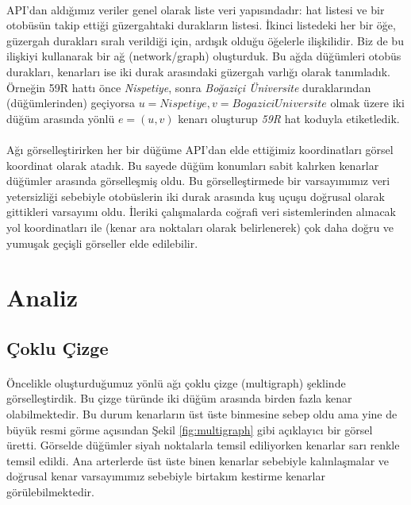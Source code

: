 \documentclass[10pt,a4paper,twocolumn]{article}
\begin{document}
\paragraph{} API'dan aldığımız veriler genel olarak liste veri yapısındadır: hat listesi ve bir otobüsün takip ettiği güzergahtaki durakların listesi. İkinci listedeki her bir öğe, güzergah durakları sıralı verildiği için, ardışık olduğu öğelerle ilişkilidir. Biz de bu ilişkiyi kullanarak bir ağ (network/graph) oluşturduk. Bu ağda düğümleri otobüs durakları, kenarları ise iki durak arasındaki güzergah varlığı olarak tanımladık. Örneğin 59R hattı önce \textit{Nispetiye}, sonra \textit{Boğaziçi Üniversite} duraklarından (düğümlerinden) geçiyorsa $u=Nispetiye, v=Bogazici Universite$ olmak üzere iki düğüm arasında yönlü $e = (u, v)$ kenarı oluşturup \textit{59R} hat koduyla etiketledik.

\paragraph{} Ağı görselleştirirken her bir düğüme API'dan elde ettiğimiz koordinatları görsel koordinat olarak atadık. Bu sayede düğüm konumları sabit kalırken kenarlar düğümler arasında görselleşmiş oldu. Bu görselleştirmede bir varsayımımız veri yetersizliği sebebiyle otobüslerin iki durak arasında kuş uçuşu doğrusal olarak gittikleri varsayımı oldu. İleriki çalışmalarda coğrafi veri sistemlerinden alınacak yol koordinatları ile (kenar ara noktaları olarak belirlenerek) çok daha doğru ve yumuşak geçişli görseller elde edilebilir.

\section{Analiz}
\subsection{Çoklu Çizge}
\paragraph{} Öncelikle oluşturduğumuz yönlü ağı çoklu çizge (multigraph) şeklinde görselleştirdik. Bu çizge türünde iki düğüm arasında birden fazla kenar olabilmektedir. Bu durum kenarların üst üste binmesine sebep oldu ama yine de büyük resmi görme açısından Şekil \ref{fig:multigraph} gibi açıklayıcı bir görsel üretti. Görselde düğümler siyah noktalarla temsil ediliyorken kenarlar sarı renkle temsil edildi. Ana arterlerde üst üste binen kenarlar sebebiyle kalınlaşmalar ve doğrusal kenar varsayımımız sebebiyle birtakım kestirme kenarlar görülebilmektedir.
\end{document}
